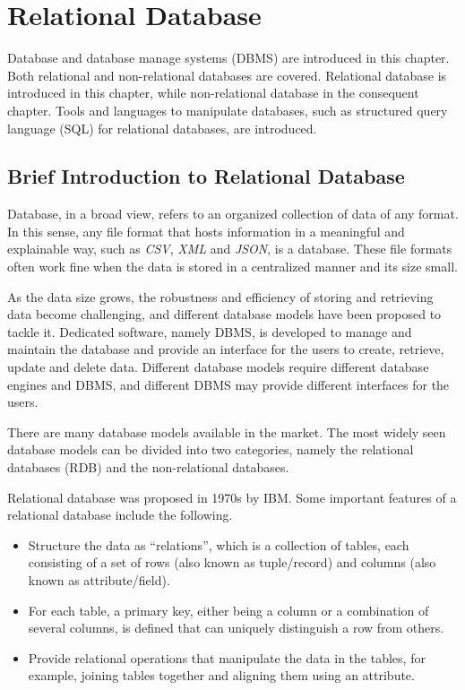 \chapter{Relational Database}

Database and database manage systems (DBMS) are introduced in this chapter. Both relational and non-relational databases are covered. Relational database is introduced in this chapter, while non-relational database in the consequent chapter. Tools and languages to manipulate databases, such as structured query language (SQL) for relational databases, are introduced.

\section{Brief Introduction to Relational Database}

Database, in a broad view, refers to an organized collection of data of any format. In this sense, any file format that hosts information in a meaningful and explainable way, such as \textit{CSV}, \textit{XML} and \textit{JSON}, is a database. These file formats often work fine when the data is stored in a centralized manner and its size small.

As the data size grows, the robustness and efficiency of storing and retrieving data become challenging, and different database models have been proposed to tackle it. Dedicated software, namely DBMS, is developed to manage and maintain the database and provide an interface for the users to create, retrieve, update and delete data. Different database models require different database engines and DBMS, and different DBMS may provide different interfaces for the users.

There are many database models available in the market. The most widely seen database models can be divided into two categories, namely the relational databases (RDB) and the non-relational databases.

Relational database was proposed in 1970s by IBM. Some important features of a relational database include the following.
\begin{itemize}
	\item Structure the data as ``relations'', which is a collection of tables, each consisting of a set of rows (also known as tuple/record) and columns (also known as attribute/field).
	\item For each table, a primary key, either being a column or a combination of several columns, is defined that can uniquely distinguish a row from others.
	\item Provide relational operations that manipulate the data in the tables, for example, joining tables together and aligning them using an attribute.
\end{itemize}

